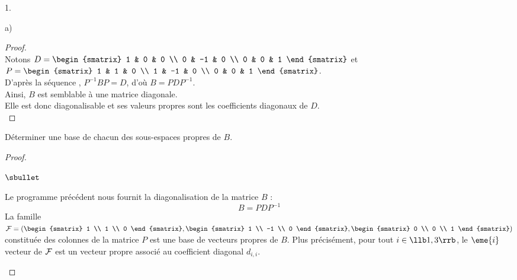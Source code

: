 \documentclass[11pt]{article}%
\begin{document}
\begin{noliste}{1.}
\begin{noliste}{a)}
    \begin{proof}~\\[.2cm]
      Notons $D = 
      \begin{smatrix} 
        1 & 0 & 0 \\ 
        0 & -1 & 0 \\ 
        0 & 0 & 1
      \end{smatrix}$ et $P = 
      \begin{smatrix} 
        1 & 1 & 0 \\ 
        1 & -1 & 0 \\ 
        0 & 0 & 1
      \end{smatrix}$.\\[.2cm]
      D'après la séquence \Scilab{}, $P^{-1}BP = D$, d'où $B =
      PDP^{-1}$. \\
      Ainsi, $B$ est semblable à une matrice diagonale.\\
      Elle est donc diagonalisable et ses valeurs propres sont les
      coefficients diagonaux de $D$. %
      ~\\[-1cm]
    \end{proof}
   	
  \item Déterminer une base de chacun des sous-espaces propres de $B$.
   	
    \begin{proof}~%
      \begin{noliste}{$\sbullet$}
      \item Le programme \Scilab{} précédent nous fournit la
        diagonalisation de la matrice $B$ :
        \[
        B = PDP^{-1}
        \]
        La famille ${\cal F} = \left(
          \begin{smatrix}
            1 \\
            1 \\
            0
          \end{smatrix},
          \begin{smatrix}
            1 \\
            -1 \\
            0
          \end{smatrix},
          \begin{smatrix}
            0 \\
            0 \\
            1
          \end{smatrix}\right)$ constituée des colonnes de la matrice
        $P$ est une base de vecteurs propres de $B$. Plus
        précisément, pour tout $i \in \llb 1, 3 \rrb$, le $\eme{i}$
        vecteur de ${\cal F}$ est un vecteur propre associé au
        coefficient diagonal $d_{i,i}$.


\end{noliste}
\end{proof}
\end{noliste}
\end{noliste}
\end{document}
